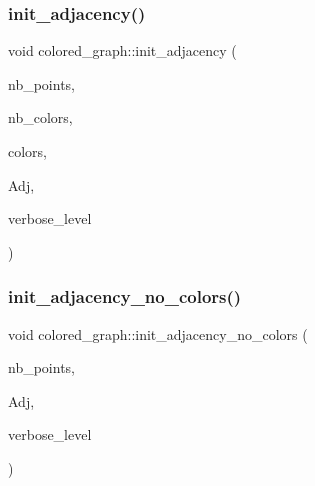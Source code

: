\mbox{\label{classcolored__graph_a7dd89f3adcb0f1d70d4bb05be6400e73}} 
\subsubsection{\texorpdfstring{init\+\_\+adjacency()}{init\_adjacency()}}
{\footnotesize\ttfamily void colored\+\_\+graph\+::init\+\_\+adjacency (\begin{DoxyParamCaption}\item[{\mbox{\hyperlink{galois_8h_a09fddde158a3a20bd2dcadb609de11dc}{I\+NT}}}]{nb\+\_\+points,  }\item[{\mbox{\hyperlink{galois_8h_a09fddde158a3a20bd2dcadb609de11dc}{I\+NT}}}]{nb\+\_\+colors,  }\item[{\mbox{\hyperlink{galois_8h_a09fddde158a3a20bd2dcadb609de11dc}{I\+NT}} $\ast$}]{colors,  }\item[{\mbox{\hyperlink{galois_8h_a09fddde158a3a20bd2dcadb609de11dc}{I\+NT}} $\ast$}]{Adj,  }\item[{\mbox{\hyperlink{galois_8h_a09fddde158a3a20bd2dcadb609de11dc}{I\+NT}}}]{verbose\+\_\+level }\end{DoxyParamCaption})}

\mbox{\label{classcolored__graph_aa5e628053139148b42e5ea61698d3bae}} 
\subsubsection{\texorpdfstring{init\+\_\+adjacency\+\_\+no\+\_\+colors()}{init\_adjacency\_no\_colors()}}
{\footnotesize\ttfamily void colored\+\_\+graph\+::init\+\_\+adjacency\+\_\+no\+\_\+colors (\begin{DoxyParamCaption}\item[{\mbox{\hyperlink{galois_8h_a09fddde158a3a20bd2dcadb609de11dc}{I\+NT}}}]{nb\+\_\+points,  }\item[{\mbox{\hyperlink{galois_8h_a09fddde158a3a20bd2dcadb609de11dc}{I\+NT}} $\ast$}]{Adj,  }\item[{\mbox{\hyperlink{galois_8h_a09fddde158a3a20bd2dcadb609de11dc}{I\+NT}}}]{verbose\+\_\+level }\end{DoxyParamCaption})}


